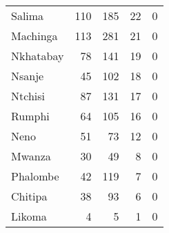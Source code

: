 \begin{tabular}{lrrrr}
Salima         &            110 &            185 &             22 &              0 \\
Machinga       &            113 &            281 &             21 &              0 \\
Nkhatabay      &             78 &            141 &             19 &              0 \\
Nsanje         &             45 &            102 &             18 &              0 \\
Ntchisi        &             87 &            131 &             17 &              0 \\
Rumphi         &             64 &            105 &             16 &              0 \\
Neno           &             51 &             73 &             12 &              0 \\
Mwanza         &             30 &             49 &              8 &              0 \\
Phalombe       &             42 &            119 &              7 &              0 \\
Chitipa        &             38 &             93 &              6 &              0 \\
Likoma         &              4 &              5 &              1 &              0 \\
\bottomrule
\end{tabular}
